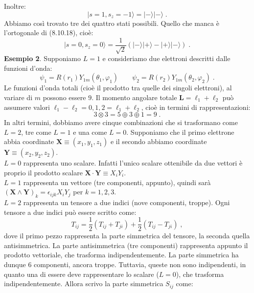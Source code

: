 \documentclass[10pt,a4paper]{report}
\theoremstyle{definition}
\numberwithin{equation}{section}
\newcommand{\ket}{\rangle}
\begin{document}
Inoltre:
\begin{equation}
|s=1,s_z=-1\ket=|-\ket|-\ket\;.
\end{equation}
Abbiamo così trovato tre dei quattro stati possibili. Quello che manca è l'ortogonale di (8.10.18), cioè:
\begin{equation}
|s=0,s_z=0\ket=\frac{1}{\sqrt{2}}(|-\ket|+\ket-|+\ket|-\ket)\;.
\end{equation}
\textbf{Esempio 2}. Supponiamo $L=1$ e consideriamo due elettroni descritti dalle funzioni d'onda:
\begin{equation}
\psi_1=R(r_1)Y_{1m}(\theta_1,\varphi_1) \qquad \psi_2=R(r_2)Y_{1m}(\theta_2,\varphi_2)\;.
\end{equation}
Le funzioni d'onda totali (cioè il prodotto tra quelle dei singoli elettroni), al variare di $m$ possono essere $9$. Il momento angolare totale $\mathbf{L}=\boldsymbol{\ell}_1+\boldsymbol{\ell}_2$ può assumere valori $\ell_1-\ell_2=0,1,2=\ell_1+\ell_2$, cioè in termini di rappresentazioni:
\begin{equation}
3\otimes 3=5\oplus 3\oplus 1=9\;.
\end{equation}
In altri termini, dobbiamo avere cinque combinazioni che si trasformano come $L=2$, tre come $L=1$ e una come $L=0$. Supponiamo che il primo elettrone abbia coordinate $\mathbf{X}\equiv (x_1,y_1,z_1)$ e il secondo abbiamo coordinate $\mathbf{Y}\equiv (x_2,y_2,z_2)$. \\
$L=0$ rappresenta uno scalare. Infatti l'unico scalare ottenibile da due vettori è proprio il prodotto scalare $\mathbf{X}\cdot\mathbf{Y}\equiv X_iY_i$. \\
$L=1$ rappresenta un vettore (tre componenti, appunto), quindi sarà $(\mathbf{X}\wedge\mathbf{Y})_k=\epsilon_{ijk}X_iY_j$ per $k=1,2,3$. \\
$L=2$ rappresenta un tensore a due indici (nove componenti, troppe). Ogni tensore a due indici può essere scritto come:
\begin{equation}
T_{ij}=\frac{1}{2}(T_{ij}+T_{ji})+\frac{1}{2}(T_{ij}-T_{ji})\;,
\end{equation}
dove il primo pezzo rappresenta la parte simmetrica del tensore, la seconda quella antisimmetrica. La parte antisimmetrica (tre componenti) rappresenta appunto il prodotto vettoriale, che trasforma indipendentemente. La parte simmetrica ha dunque $6$ componenti, ancora troppe. Tuttavia, queste non sono indipendenti, in quanto una di essere deve rappresentare lo scalare ($L=0$), che trasforma indipendentemente. Allora scrivo la parte simmetrica $S_{ij}$ come:
\end{document}
